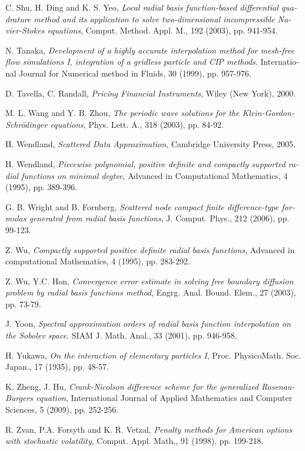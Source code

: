 \begin{thebibliography}{99}
\begin{latin}
\bibitem{[12]} {\sc C. Shu, H. Ding and K. S. Yeo}, {\em Local radial basis
function-based differential quadrature method and its application
to solve two-dimensional incompressible Navier-Stokes equations},
Comput. Method. Appl. M., 192 (2003), pp. 941-954.

\bibitem{[73]} {\sc N. Tanaka}, {\em Development of a highly accurate
interpolation method for mesh-free flow simulations I, integration
of a gridless particle and CIP methods}. International Journal for
Numerical method in Fluids, 30 (1999), pp. 957-976.

\bibitem{[50]} {\sc D. Tavella, C. Randall}, {\em Pricing Financial Instruments}, Wiley (New York),
2000.

\bibitem {[65]} {\sc M. L. Wang and Y. B. Zhou}, {\em The periodic wave solutions for the Klein-Gordon-Schr\"{o}dinger
equations},  Phys. Lett. A., 318 (2003), pp. 84-92.

\bibitem{[9]} {\sc H. Wendland}, {\em Scattered Data Approximation}, Cambridge University Press, 2005.

\bibitem{[2]} {\sc H. Wendland}, {\em Piecewise polynomial, positive definite
and compactly supported radial functions on minimal degtee},
Advanced in Computational Mathematics, 4 (1995), pp. 389-396.

\bibitem{[11]} {\sc G. B. Wright and B. Fornberg}, {\em Scattered node compact
finite difference-type formulas generated from radial basis
functions}, J. Comput. Phys., 212 (2006), pp. 99-123.

\bibitem{[1]} {\sc Z. Wu}, {\em Compactly supported positive definite radial
basis functions}, Advanced in computational Mathematics, 4 (1995),
pp. 283-292.

\bibitem{[54]} {\sc Z. Wu, Y.C. Hon}, {\em Convergence error estimate in solving free
boundary diffusion problem by radial basis functions method},
Engrg. Anal. Bound. Elem., 27 (2003), pp. 73-79.

\bibitem{[7]} {\sc J. Yoon}, {\em Spectral approximation orders of radial basis function interpolation on the Sobolev
space}. SIAM J. Math. Anal., 33 (2001), pp. 946-958.

\bibitem {[62]} {\sc H. Yukawa}, {\em On the interaction of elementary particles I}, Proc.
PhysicoMath. Soc. Japan., 17 (1935), pp. 48-57.

\bibitem{[49]} {\sc K. Zheng, J. Hu}, {\em Crank-Nicolson difference scheme for the
generalized Rosenau-Burgers equation}, International Journal of
Applied Mathematics and Computer Sciences, 5 (2009), pp. 252-256.

\bibitem{[60]} {\sc R. Zvan, P.A. Forsyth and K. R. Vetzal}, {\em Penalty methods for American options
with stochastic volatility}, Comput. Appl. Math., 91 (1998), pp.
199-218.
\end{latin} 	
\end{thebibliography}